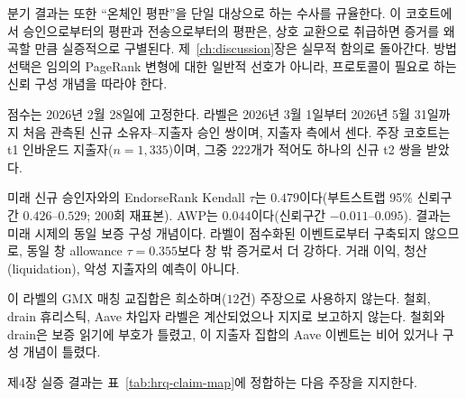 분기 결과는 또한 ``온체인 평판''을 단일 대상으로 하는 수사를 규율한다. 이 코호트에서 승인으로부터의 평판과 전송으로부터의 평판은, 상호 교환으로 취급하면 증거를 왜곡할 만큼 실증적으로 구별된다. 제~\ref{ch:discussion}장은 실무적 함의로 돌아간다. 방법 선택은 임의의 PageRank 변형에 대한 일반적 선호가 아니라, 프로토콜이 필요로 하는 신뢰 구성 개념을 따라야 한다.


점수는 2026년 2월 28일에 고정한다. 라벨은 2026년 3월 1일부터 2026년 5월 31일까지 처음 관측된 신규 소유자--지출자 승인 쌍이며, 지출자 측에서 센다. 주장 코호트는 t1 인바운드 지출자($n=1{,}335$)이며, 그중 $222$개가 적어도 하나의 신규 t2 쌍을 받았다.

미래 신규 승인자와의 EndorseRank Kendall $\tau$는 $0.479$이다(부트스트랩 95\% 신뢰구간 $0.426$--$0.529$; $200$회 재표본). AWP는 $0.044$이다(신뢰구간 $-0.011$--$0.095$). 결과는 미래 시제의 동일 보증 구성 개념이다. 라벨이 점수화된 이벤트로부터 구축되지 않으므로, 동일 창 allowance $\tau=0.355$보다 창 밖 증거로서 더 강하다. 거래 이익, 청산(liquidation), 악성 지출자의 예측이 아니다.

이 라벨의 GMX 매칭 교집합은 희소하며($12$건) 주장으로 사용하지 않는다. 철회, drain 휴리스틱, Aave 차입자 라벨은 계산되었으나 지지로 보고하지 않는다. 철회와 drain은 보증 읽기에 부호가 틀렸고, 이 지출자 집합의 Aave 이벤트는 비어 있거나 구성 개념이 틀렸다.


제4장 실증 결과는 표~\ref{tab:hrq-claim-map}에 정합하는 다음 주장을 지지한다.

